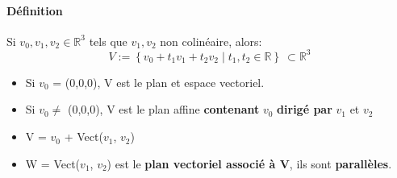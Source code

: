\documentclass[10pt,a4paper]{book}
\newcommand{\R}{\mathbb{R}}
\begin{document}
\paragraph{Définition} Si $v_0, v_1, v_2 \in \R^3$ tels que $v_1, v_2$ non colinéaire, alors:
\[V:= \left\lbrace v_0 + t_1v_1 + t_2v_2 \;|\; t_1, t_2 \in \R \right\rbrace\ \subset \R^3 \]
\begin{itemize}
\item Si $v_0$ = (0,0,0), V est le plan et espace vectoriel.
\item Si $v_0 \neq$ (0,0,0), V est le plan affine \textbf{contenant} $v_0$ \textbf{dirigé par} $v_1$ et $v_2$
\item V = $v_0$ + Vect($v_1$, $v_2$) 
\item W = Vect($v_1$, $v_2$) est le \textbf{plan vectoriel associé à V}, ils sont \textbf{parallèles}.
\end{itemize}
\end{document}
